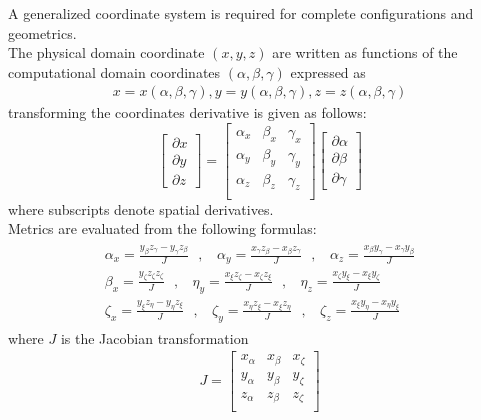 \documentclass[11pt]{report}
\newcommand{\sps}{\\[0.2cm]}
\newcommand{\NI}{\noindent}
\begin{document}
	\NI A generalized coordinate system is required for complete configurations and geometrics.\\
	The physical domain coordinate $(x,y,z)$ are written as functions of the computational domain coordinates $(\alpha,\beta,\gamma)$ expressed as
	\begin{eqnarray}
		x=x(\alpha,\beta,\gamma), y = y(\alpha,\beta,\gamma), z=z(\alpha,\beta,\gamma)\label{eq:4_7}
	\end{eqnarray} 
	transforming the coordinates derivative is given as follows:
	\begin{equation}
		\begin{bmatrix}
			\partial x\\
			\partial y \\
			\partial z
		\end{bmatrix} = 
		\begin{bmatrix}
			\alpha_x & \beta_x & \gamma_x\\
			\alpha_y & \beta_y & \gamma_y\\
			\alpha_z & \beta_z & \gamma_z\\
		\end{bmatrix}
		\begin{bmatrix}
			\partial \alpha\\
			\partial\beta\\
			\partial\gamma
		\end{bmatrix}\label{eq:4_8}
	\end{equation}
	where subscripts denote spatial derivatives.\\
	Metrics are evaluated from the following formulas:
	\begin{gather}
		\begin{gathered}
			\alpha_x = \frac{y_\beta z_\gamma - y_\gamma z_\beta}{J}~~~,~~~~ \alpha_y = \frac{x_\gamma z_\beta - x_\beta z_\gamma}{J}~~~,~~~~\alpha_z = \frac{x_\beta y_\gamma - x_\gamma y_\beta}{J}\sps
			\beta_x = \frac{y_\zeta z_\zeta z_\zeta}{J}~~~,~~~~ \eta_y = \frac{x_\xi z_\zeta - x_\zeta z_\xi}{J}~~~,~~~~ \eta_z = \frac{x_\zeta y_\xi - x_\xi y_\zeta}{J}\sps
			\zeta_x = \frac{y_\xi z_\eta - y_\eta z_\xi}{J}~~~,~~~~ \zeta_y = \frac{x_\eta z_\xi - x_\xi z_\eta}{J}~~~,~~~~ \zeta_z = \frac{x_\xi y_\eta - x_\eta y_\xi}{J}
		\end{gathered}
	\end{gather}
	where $J$ is the Jacobian transformation
	\begin{eqnarray}
		J = \begin{bmatrix}
			x_\alpha & x_\beta & x_\zeta\sps
			y_\alpha & y_\beta & y_\zeta\sps
			z_\alpha & z_\beta & z_\zeta\sps
		\end{bmatrix}
	\end{eqnarray}
\end{document}
